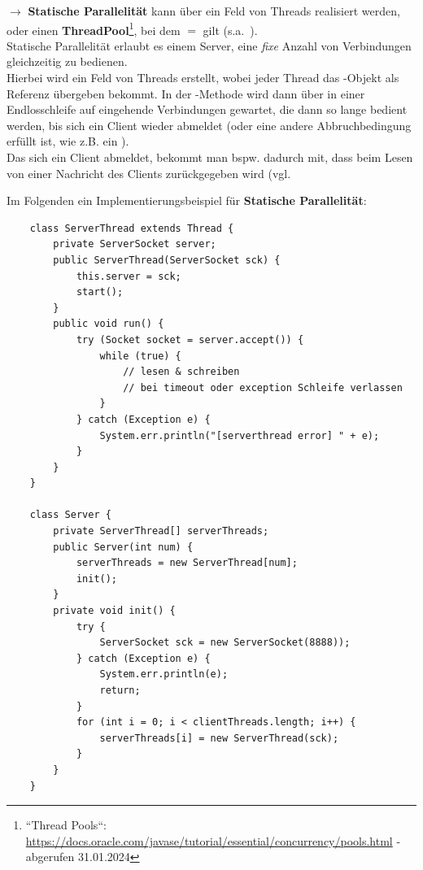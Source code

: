 $\rightarrow$ \textbf{Statische Parallelität} kann über ein Feld von Threads realisiert werden, oder einen \textbf{ThreadPool}\footnote{
``Thread Pools``: \url{https://docs.oracle.com/javase/tutorial/essential/concurrency/pools.html} - abgerufen 31.01.2024
}, bei dem  $=$  gilt (s.a.~\cite[146]{Oec22}).\\

\noindent
Statische Parallelität erlaubt es einem Server, eine \textit{fixe} Anzahl von Verbindungen gleichzeitig zu bedienen.\\
Hierbei wird ein Feld von Threads erstellt, wobei jeder Thread das -Objekt als Referenz übergeben bekommt.
In der -Methode wird dann über  in einer Endlosschleife auf eingehende Verbindungen gewartet, die dann so lange bedient werden, bis sich ein Client wieder abmeldet (oder eine andere Abbruchbedingung erfüllt ist, wie z.B. ein ).\\
Das sich ein Client abmeldet, bekommt man bspw. dadurch mit, dass  beim Lesen von einer Nachricht des Clients zurückgegeben wird (vgl. \cite[286]{Oec22}

\noindent
Im Folgenden ein Implementierungsbeispiel für \textbf{Statische Parallelität}:
\begin{verbatim}
    class ServerThread extends Thread {
        private ServerSocket server;
        public ServerThread(ServerSocket sck) {
            this.server = sck;
            start();
        }
        public void run() {
            try (Socket socket = server.accept()) {
                while (true) {
                    // lesen & schreiben
                    // bei timeout oder exception Schleife verlassen
                }
            } catch (Exception e) {
                System.err.println("[serverthread error] " + e);
            }
        }
    }

    class Server {
        private ServerThread[] serverThreads;
        public Server(int num) {
            serverThreads = new ServerThread[num];
            init();
        }
        private void init() {
            try {
                ServerSocket sck = new ServerSocket(8888));
            } catch (Exception e) {
                System.err.println(e);
                return;
            }
            for (int i = 0; i < clientThreads.length; i++) {
                serverThreads[i] = new ServerThread(sck);
            }
        }
    }
\end{verbatim}

